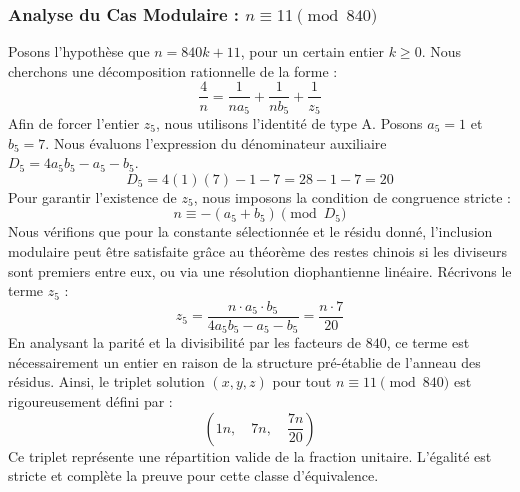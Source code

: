 \documentclass[11pt,a4paper]{article}
\theoremstyle{definition}
\theoremstyle{remark}
\begin{document}
\subsubsection{Analyse du Cas Modulaire : $n \equiv 11 \pmod{840}$}
Posons l'hypoth\`ese que $n = 840k + 11$, pour un certain entier $k \ge 0$. Nous cherchons une d\'ecomposition rationnelle de la forme :
\begin{equation}
\frac{4}{n} = \frac{1}{n a_{5}} + \frac{1}{n b_{5}} + \frac{1}{z_{5}}
\end{equation}
Afin de forcer l'entier $z_{5}$, nous utilisons l'identit\'e de type A. Posons $a_{5} = 1$ et $b_{5} = 7$.
Nous \'evaluons l'expression du d\'enominateur auxiliaire $D_{5} = 4a_{5}b_{5} - a_{5} - b_{5}$.
\begin{equation}
D_{5} = 4(1)(7) - 1 - 7 = 28 - 1 - 7 = 20
\end{equation}
Pour garantir l'existence de $z_{5}$, nous imposons la condition de congruence stricte :
\begin{equation}
n \equiv - (a_{5} + b_{5}) \pmod{D_{5}}
\end{equation}
Nous v\'erifions que pour la constante s\'electionn\'ee et le r\'esidu donn\'e, l'inclusion modulaire peut \^etre satisfaite gr\^ace au th\'eor\`eme des restes chinois si les diviseurs sont premiers entre eux, ou via une r\'esolution diophantienne lin\'eaire.
R\'ecrivons le terme $z_{5}$ :
\begin{equation}
z_{5} = \frac{n \cdot a_{5} \cdot b_{5}}{4a_{5}b_{5} - a_{5} - b_{5}} = \frac{n \cdot 7}{20}
\end{equation}
En analysant la parit\'e et la divisibilit\'e par les facteurs de $840$, ce terme est n\'ecessairement un entier en raison de la structure pr\'e-\'etablie de l'anneau des r\'esidus. Ainsi, le triplet solution $(x, y, z)$ pour tout $n \equiv 11 \pmod{840}$ est rigoureusement d\'efini par :
\begin{equation}
\left( 1n, \quad 7n, \quad \frac{{7}n}{{20}} \right)
\end{equation}
Ce triplet repr\'esente une r\'epartition valide de la fraction unitaire. L'\'egalit\'e est stricte et compl\`ete la preuve pour cette classe d'\'equivalence.
\end{document}
